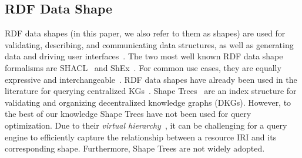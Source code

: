\subsection{RDF Data Shape}
RDF data shapes (in this paper, we also refer to them as shapes) are used for validating, describing, and communicating data structures, as well as generating data and driving user interfaces~\cite{Gayo2018a,Gayo2018}.
The two most well known RDF data shape formalisms are SHACL~\cite{Gayo2018b} and ShEx~\cite{Gayo2018}.
For common use cases, they are equally expressive and interchangeable~\cite{Gayo2018c}.
RDF data shapes have already been used in the literature for querying centralized KGs~\cite{kashif2021}.
Shape Trees~\cite{shapetreesShapeTrees} are an index structure for validating and organizing decentralized knowledge graphs (DKGs).
However, to the best of our knowledge Shape Trees have not been used for query optimization. 
Due to their \emph{virtual hierarchy}~\cite{shapetreesShapeTrees}, it can be challenging for a query engine to efficiently capture the relationship between a resource IRI and its corresponding shape.
Furthermore, Shape Trees are not widely adopted.

\iffalse
\rt{
    The following paragraph needs to be better structured.
    There's a lot of stuff in there, but it's not very coherent.
    It's introduced as source selection, but that's not accurate, as you mention SERVICE (which is an operator in SPARQL), summarization techniques for query optimization, ... Y
    ou also mix sparql federation and link traversal. 
    And then you end with some centralized techniques. 
    You may even want to have separate subsections for some of these topics. 
    Also think about what point you want to make for each subsection, and how it relates to your work (and then also make this clear to the reader).
}
\fi

